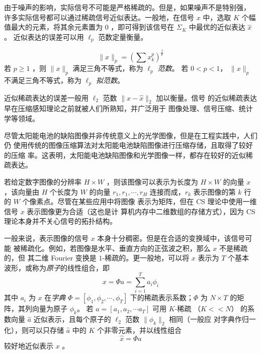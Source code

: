由于噪声的影响，实际信号不可能是严格稀疏的。但是，如果噪声不是特别强，
许多实际信号都可以通过稀疏信号近似表达。一般地，在信号 $x$ 中，选取
$K$ 个幅值最大的元素，将其余元素置为 $0$ ，即可得到该信号在 $\Sigma_K$
中最优的近似表达 $\hat x$。\cite{KeepK} 近似表达的误差可以用 $\ell_p$
范数定量衡量。
\begin{definition} \label{def:lp}
\begin{equation}
\|x\|_p = \left( \sum x_k^p \right)^{\frac{1}{p}}
\end{equation}
若 $p \geq 1$ ，则 $\|x\|_p$ 满足三角不等式，称为 \emph{$\ell_p$ 范数}。
若 $0 < p < 1$， $\|x\|_p$ 不满足三角不等式，称为 \emph{$\ell_p$ 拟范数}。
\end{definition}

近似稀疏表达的误差一般用 $\ell_2$ 范数 $\|x - \hat x\|_2$ 加以衡量。信号
的近似稀疏表达早在压缩感知理论之前就被人们所熟知，并广泛用于
图像处理\cite{SparseImage}、信号压缩、统计学\cite{lasso}等领域。

尽管太阳能电池的缺陷图像并非传统意义上的光学图像，但是在工程实践中，人们仍
使用传统的图像压缩算法对太阳能电池缺陷图像进行压缩存储，且取得了较好的压缩
率。这表明，太阳能电池缺陷图像和光学图像一样，都存在较好的近似稀疏表达。

若给定数字图像的分辨率 $H \times W$ ，则该图像可以表示为长度为 $H \times W$
的向量 $x$ ，该向量由 $H$ 个长度为 $W$ 的向量 $r_1, r_1, \cdots, r_H$
连接而成，$r_k$ 表示图像的第 $k$ 行的 $W$ 个像素点。尽管在某些应用中将图像
表示为矩阵，但在 CS 理论中使用一维信号 $x$ 表示图像更为合适（这也是计
算机内存中二维数组的存储方式），因为 CS 理论本身并不关心信号的拓扑结构。

一般来说，表示图像的信号 $x$ 本身十分稠密。但是在合适的变换域中，该信号可能
被稀疏化。例如，若图像是水平、垂直方向的正弦波之积，那么 $x$ 不是稀疏的，但
其二维 Fourier 变换是 $1$-稀疏的。更一般地，可以将 $x$ 表示为 $T$ 个基本
波形，或称为\emph{原子}的线性组合，即
\begin{equation}
x = \Phi a = \sum_{i=1}^T a_i \phi_i
\end{equation}
其中 $a_i$ 为 $x$ 在\emph{字典} $\Phi = [\phi_1, \phi_2, \cdots, \phi_T]$
下的稀疏表示系数；$\Phi$ 为 $N \times T$ 的矩阵，其列向量为原子 $\phi_k$。
若 $a = [a_1, a_2, \cdots a_T]$ 可用 $K$-稀疏 （$K << N$） 的系数向量
$\hat a$ 近似表示，且每个原子的 $\ell_2$ 范数 $\|\phi_k\|_2$ 相同（一般应
对字典作归一化），则可以只存储 $\hat a$ 中的 $K$ 个非零元素，并以线性组合
\begin{equation}
\hat x = \Phi \hat a
\end{equation}
较好地近似表示 $x$ 。

